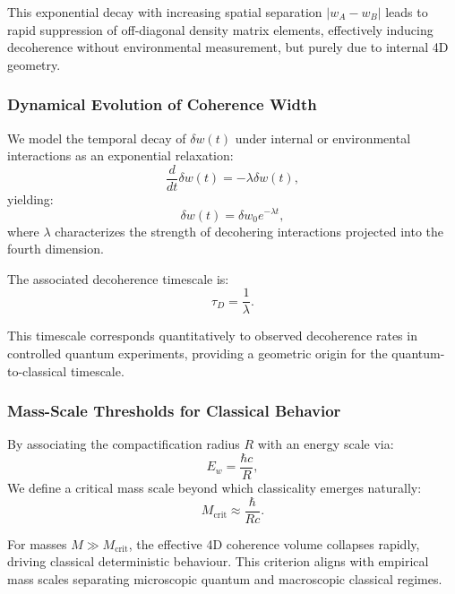 \documentclass[12pt]{article}
\begin{document}
This exponential decay with increasing spatial separation \( |w_A - w_B| \) leads to rapid suppression of off-diagonal density matrix elements, effectively inducing decoherence without environmental measurement, but purely due to internal 4D geometry.

\subsubsection*{Dynamical Evolution of Coherence Width}

We model the temporal decay of \(\delta w(t)\) under internal or environmental interactions as an exponential relaxation:
\begin{equation}
\frac{d}{dt} \delta w(t) = -\lambda \delta w(t),
\label{eq:delta_w_decay}
\end{equation}
yielding:
\begin{equation}
\delta w(t) = \delta w_0 e^{-\lambda t},
\label{eq:delta_w_solution}
\end{equation}
where \(\lambda\) characterizes the strength of decohering interactions projected into the fourth dimension.

The associated decoherence timescale is:
\begin{equation}
\tau_D = \frac{1}{\lambda}.
\label{eq:decoherence_timescale_def}
\end{equation}

This timescale corresponds quantitatively to observed decoherence rates in controlled quantum experiments, providing a geometric origin for the quantum-to-classical timescale.

\subsubsection*{Mass-Scale Thresholds for Classical Behavior}

By associating the compactification radius \(R\) with an energy scale via:
\begin{equation}
E_w = \frac{\hbar c}{R},
\label{eq:compactification_energy}
\end{equation}
We define a critical mass scale beyond which classicality emerges naturally:
\begin{equation}
M_{\mathrm{crit}} \approx \frac{\hbar}{R c}.
\label{eq:mass_critical_def}
\end{equation}

For masses \(M \gg M_{\mathrm{crit}}\), the effective 4D coherence volume collapses rapidly, driving classical deterministic behaviour. This criterion aligns with empirical mass scales separating microscopic quantum and macroscopic classical regimes.
\end{document}
